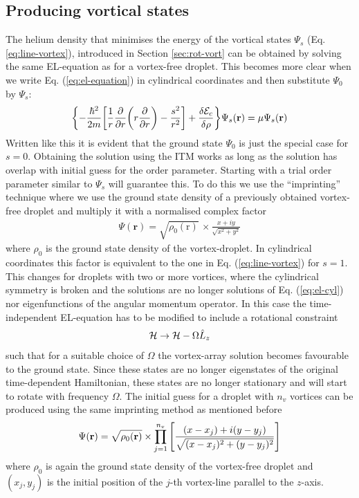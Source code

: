 \documentclass[12pt,a4paper,twosides]{book}
\renewcommand{\vec}[1]{\bm{\mathrm{#1}}}
\begin{document}
		\subsection{Producing vortical states}\label{sec:vortical-states}
			The helium density that minimises the energy of the vortical states $\Psi_s$ (Eq. \ref{eq:line-vortex}), introduced in Section \ref{sec:rot-vort} can be obtained by solving the same EL-equation as for a vortex-free droplet. This becomes more clear when we write Eq. (\ref{eq:el-equation}) in cylindrical coordinates and then substitute $\Psi_0$ by $\Psi_s$:
			\begin{align}
				\qty{-\frac{\hbar^2}{2m}\qty[\frac{1}{r}\pdv{r}\qty(r\pdv{r})-\frac{s^2}{r^2}]+\fdv{\mathcal{E}_c}{\rho}}\Psi_s(\vec{r}) = \mu\Psi_s(\vec{r}) \label{eq:el-cyl}
			\end{align}
			Written like this it is evident that the ground state $\Psi_0$ is just the special case for $s=0$. Obtaining the solution using the ITM works as long as the solution has overlap with initial guess for the order parameter. Starting with a trial order parameter similar to $\Psi_s$ will guarantee this. To do this we use the ``imprinting'' technique where we use the ground state density of a previously obtained vortex-free droplet and multiply it with a normalised complex factor
			\begin{align}
				\Psi(\mathbf{r}) = \sqrt{\rho_0(\vec{r})} \,\times \frac{x + iy}{\sqrt{x^2 + y^2}} \label{eq28}
			\end{align}
			where $\rho_0$ is the ground state density of the vortex-droplet.  In cylindrical coordinates this factor is equivalent to the one in Eq. (\ref{eq:line-vortex}) for $s=1$.\\ 
			
			This changes for droplets with two or more vortices, where the cylindrical symmetry is broken and the solutions are no longer solutions of Eq. (\ref{eq:el-cyl}) nor eigenfunctions of the angular momentum operator. In this case the time-independent EL-equation has to be modified to include a rotational constraint
			\begin{align}
				{\cal H} \rightarrow {\cal H}-\Omega \hat{L}_z
			\end{align}
			 such that for a suitable choice of $\Omega$ the vortex-array solution becomes favourable to the ground state. Since these states are no longer eigenstates of the original time-dependent Hamiltonian, these states are no longer stationary and will start to rotate with frequency $\Omega$. The initial guess for a droplet with $n_v$ vortices can be produced using the same imprinting method as mentioned before		
			\begin{align}
				\Psi(\mathbf{r})=\sqrt{\rho_0(\vec{r})} \times \prod _{j=1}^{n_v}\left[ {(x-x_j)+i(y-y_j) \over \sqrt{(x-x_j)^2+(y-y_j)^2}}  \right] \label{eq32}
			\end{align}
			where $\rho_0$ is again the ground state density of the vortex-free droplet and $(x_j,y_j)$ is the initial position of the $j$-th vortex-line parallel to the $z$-axis.
\end{document}
